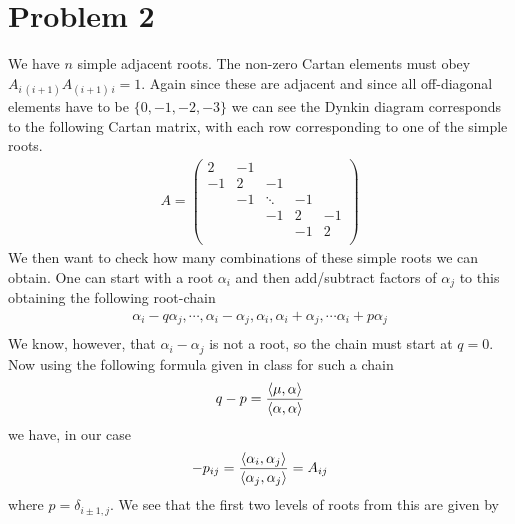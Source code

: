 \documentclass[a4paper,12pt]{article}
\begin{document}
\section*{Problem 2}
We have $n$ simple adjacent roots. The non-zero Cartan elements must obey $A_{i\,(i+1)}A_{(i+1)\,i}=1$. Again since these are adjacent and since all off-diagonal elements have to be $\{0,-1,-2,-3\}$ we can see the Dynkin diagram corresponds to the following Cartan matrix, with each row corresponding to one of the simple roots.
\begin{equation}
	\begin{aligned}
		A=\begin{pmatrix}
			2 & -1 & & &\\
			-1 & 2 & -1 & &\\
			 &  -1& \ddots  &-1 &\\
			 & & -1 & 2&-1\\
			 & &  &-1 & 2\\
		\end{pmatrix}
	\end{aligned}
\end{equation}
We then want to check how many combinations of these simple roots we can obtain. One can start with a root $\alpha_i$ and then add/subtract factors of $\alpha_j$ to this obtaining the following root-chain
\begin{equation}
	\begin{aligned}
	\alpha_i-q\alpha_j,\cdots,\alpha_i -\alpha_j,	\alpha_i,\alpha_i +\alpha_j,\cdots \alpha_i+p\alpha_j\\
	\end{aligned}
\end{equation}
We know, however, that $\alpha_i-\alpha_j$ is not a root, so the chain must start at $q=0$. Now using the following formula given in class for such a chain
\begin{equation}  \label{eq:minw}
	\begin{aligned}
		q-p=\frac{\expval{\mu,\alpha}}{\expval{\alpha,\alpha}}
	\end{aligned}
\end{equation}
we have, in our case
\begin{equation}  \label{eq:minw}
	\begin{aligned}
		-p_{ij}=\frac{\expval{\alpha_i,\alpha_j}}{\expval{\alpha_j,\alpha_j}}=A_{ij}
	\end{aligned}
\end{equation}
where $p=\delta_{i\pm 1,j}$. We see that the first two levels of roots from this are given by
\end{document}
